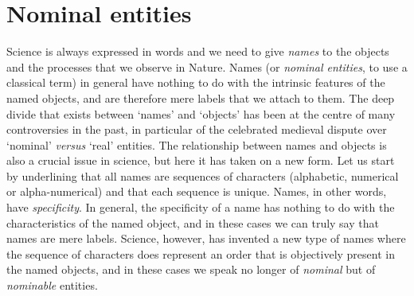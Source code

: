 \documentclass[12pt]{article}
\begin{document}
\section{Nominal entities}
Science is always expressed in words and we need to give \textit{names} to the objects and the processes that we observe in Nature. Names (or \textit{nominal entities}, to use a classical term) in general have nothing to do with the intrinsic features of the named objects, and are therefore mere labels that we attach to them. The deep divide that exists between `names' and `objects' has been at the centre of many controversies in the past, in particular of the celebrated medieval dispute over `nominal' \textit{versus} `real' entities. The relationship between names and objects is also a crucial issue in science, but here it has taken on a new form. Let us start by underlining that all names are sequences of characters (alphabetic, numerical or alpha-numerical) and that each sequence is unique. Names, in other words, have \textit{specificity}. In general, the specificity of a name has nothing to do with the characteristics of the named object, and in these cases we can truly say that names are mere labels. Science, however, has invented a new type of names where the sequence of characters does represent an order that is objectively present in the named objects, and in these cases we speak no longer of \textit{nominal} but of \textit{nominable} entities. 

\hypertarget{nominable_entity}{}
\end{document}
